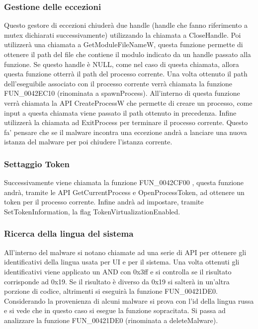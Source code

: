 \documentclass[a4paper,12pt]{article}
\begin{document}
\subsubsection{Gestione delle eccezioni}
Questo gestore di eccezioni chiuderà due handle (handle che fanno riferimento a mutex dichiarati successivamente) utilizzando la chiamata a CloseHandle. Poi utilizzerà una chiamata a GetModuleFileNameW, questa funzione permette di ottenere il path del file che contiene il modulo indicato da un handle passato alla funzione. Se questo handle è NULL, come nel caso di questa chiamata, allora questa funzione otterrà il path del processo corrente. Una volta ottenuto il path dell'eseguibile associato con il processo corrente verrà chiamata la funzione FUN\_0042EC10 (rinominata a spawnProcess). All'interno di questa funzione verrà chiamata la API CreateProcessW che permette di creare un processo, come input a questa chiamata viene passato il path ottenuto in precedenza. Infine utilizzerà la chiamata ad ExitProcess per terminare il processo corrente. Questo fa' pensare che se il malware incontra una eccezione andrà a lanciare una nuova istanza del malware per poi chiudere l'istanza corrente.

\subsubsection{Settaggio Token}
Successivamente viene chiamata la funzione FUN\_0042CF00 , questa funzione andrà, tramite le API GetCurrentProcess e OpenProcessToken, ad ottenere un token per il processo corrente. Infine andrà ad impostare, tramite SetTokenInformation, la flag TokenVirtualizationEnabled.

\subsubsection{Ricerca della lingua del sistema}
All'interno del malware si notano chiamate ad una serie di API per ottenere gli identificativi della lingua usata per UI e per il sistema. Una volta ottenuti gli identificativi viene applicato un AND con 0x3ff e si controlla se il risultato corrisponde ad 0x19. Se il risultato è diverso da 0x19 si salterà in un'altra porzione di codice, altrimenti si eseguirà la funzione FUN\_00421DE0.
Considerando la provenienza di alcuni malware si prova con l'id della lingua russa e si vede che in questo caso si esegue la funzione sopracitata. Si passa ad analizzare la funzione FUN\_00421DE0 (rinominata a deleteMalware). 
\end{document}
